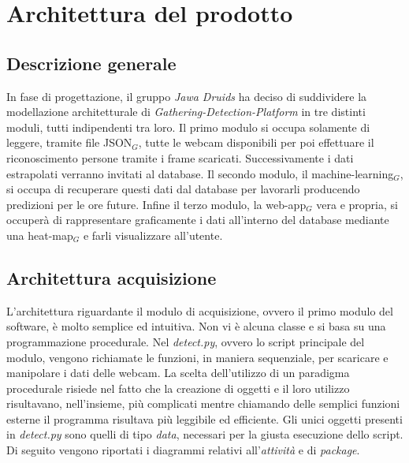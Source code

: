 \chapter{Architettura del prodotto}\label{ArchitetturaDelProdotto}

\section{Descrizione generale}
In fase di progettazione, il gruppo \textit{Jawa Druids} ha deciso di suddividere la modellazione architetturale di \textit{Gathering-Detection-Platform} in tre distinti moduli, tutti indipendenti tra loro.
Il primo modulo si occupa solamente di leggere, tramite file JSON$_G$, tutte le webcam disponibili per poi effettuare il riconoscimento persone tramite i frame scaricati. Successivamente i dati estrapolati verranno invitati al database.
Il secondo modulo, il machine-learning$_G$, si occupa di recuperare questi dati dal database per lavorarli producendo predizioni per le ore future.
Infine il terzo modulo, la web-app$_G$ vera e propria, si occuperà di rappresentare graficamente i dati all'interno del database mediante una heat-map$_G$ e farli visualizzare all'utente.

\section{Architettura acquisizione}\label{ArchitetturaDelProdottoAcquisition}
L'architettura riguardante il modulo di acquisizione, ovvero il primo modulo del software, è molto semplice ed intuitiva.
Non vi è alcuna classe e si basa su una programmazione procedurale.
Nel \textit{detect.py}, ovvero lo script principale del modulo, vengono richiamate le funzioni, in maniera sequenziale, per scaricare e manipolare i dati delle webcam.
La scelta dell'utilizzo di un paradigma procedurale risiede nel fatto che la creazione di oggetti e il loro utilizzo risultavano, nell'insieme, più complicati mentre chiamando delle semplici funzioni esterne il programma risultava più leggibile ed efficiente.
Gli unici oggetti presenti in \textit{detect.py} sono quelli di tipo \textit{data}, necessari per la giusta esecuzione dello script.
Di seguito vengono riportati i diagrammi relativi all'\textit{attività} e di \textit{package}.

